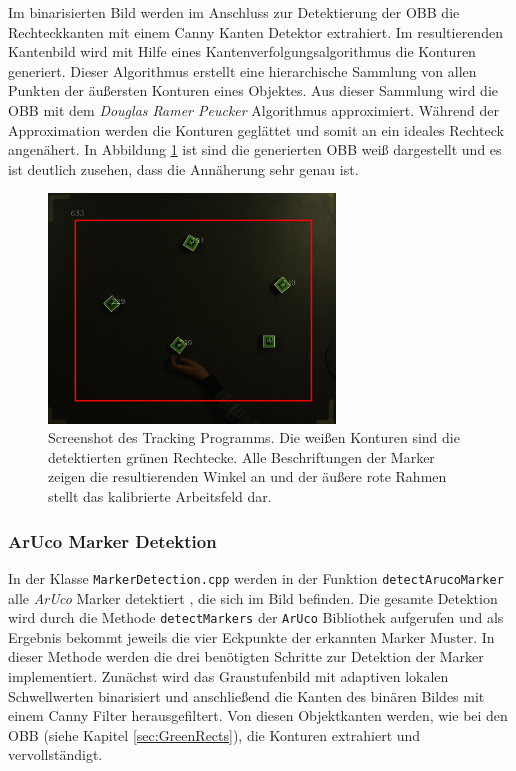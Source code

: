 Im binarisierten Bild werden im Anschluss zur Detektierung der OBB die Rechteckkanten mit einem Canny Kanten Detektor extrahiert\cite{article:Canny}. Im resultierenden Kantenbild wird mit Hilfe eines Kantenverfolgungsalgorithmus \cite{article:FindConturs} die Konturen generiert. Dieser Algorithmus erstellt eine hierarchische Sammlung von allen Punkten der äußersten Konturen eines Objektes. Aus dieser Sammlung wird die OBB mit dem \textit{Douglas Ramer Peucker} Algorithmus \cite{article:RamerPeucker} approximiert. Während der Approximation werden die Konturen geglättet und somit an ein ideales Rechteck angenähert. In Abbildung \ref{fig:DebugScreenshot} ist sind die generierten OBB weiß dargestellt und es ist deutlich zusehen, dass die Annäherung sehr genau ist.
\begin{figure}[H]
	\centering
	\includegraphics[width=3in]{Bilder/TrackingScreenshot_x.jpg}
	\caption{Screenshot des Tracking Programms. Die weißen Konturen sind die detektierten grünen Rechtecke. Alle Beschriftungen der Marker zeigen die resultierenden Winkel an und der äußere rote Rahmen stellt das kalibrierte Arbeitsfeld dar.}
	\label{fig:DebugScreenshot}
\end{figure}
\subsubsection{ArUco Marker Detektion}\label{sec:ArucoMarkerTracking}
 In der Klasse \texttt{MarkerDetection.cpp} werden in der Funktion \texttt{detectArucoMarker} alle \textit{ArUco} Marker detektiert \cite{article:Aruco2014}, die sich im Bild befinden. Die gesamte Detektion wird durch die Methode \texttt{detectMarkers} der \texttt{ArUco} Bibliothek aufgerufen und als Ergebnis bekommt jeweils die vier Eckpunkte der erkannten Marker Muster. In dieser Methode werden die drei benötigten Schritte zur Detektion der Marker implementiert. Zunächst wird das Graustufenbild mit adaptiven lokalen Schwellwerten binarisiert und anschließend die Kanten des binären Bildes mit einem Canny Filter \cite{article:Canny} herausgefiltert. Von diesen Objektkanten werden, wie bei den OBB (siehe Kapitel \ref{sec:GreenRects}), die Konturen extrahiert und vervollständigt.
  
